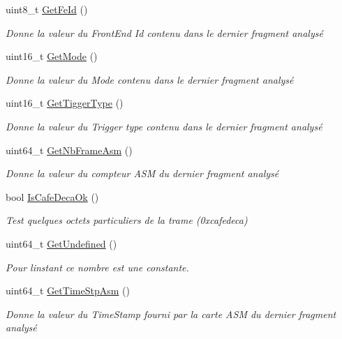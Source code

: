 \begin{DoxyCompactItemize}
uint8\+\_\+t \hyperlink{class_decode_frame_a27a2218fdc331c7c4afb1b57c103edac}{Get\+Fe\+Id} ()
\begin{DoxyCompactList}\small\item\em Donne la valeur du Front\+End Id contenu dans le dernier fragment analysé \end{DoxyCompactList}\item 
uint16\+\_\+t \hyperlink{class_decode_frame_a0bb520a314a74665a0092dbbf0f32310}{Get\+Mode} ()
\begin{DoxyCompactList}\small\item\em Donne la valeur du Mode contenu dans le dernier fragment analysé \end{DoxyCompactList}\item 
uint16\+\_\+t \hyperlink{class_decode_frame_a4bd099178e4f7a067dac451d2cb844b2}{Get\+Tigger\+Type} ()
\begin{DoxyCompactList}\small\item\em Donne la valeur du Trigger type contenu dans le dernier fragment analysé \end{DoxyCompactList}\item 
uint64\+\_\+t \hyperlink{class_decode_frame_affbc2d0f3774cb4fff34b42c446a5955}{Get\+Nb\+Frame\+Asm} ()
\begin{DoxyCompactList}\small\item\em Donne la valeur du compteur A\+SM du dernier fragment analysé \end{DoxyCompactList}\item 
bool \hyperlink{class_decode_frame_a6dfe57ddaf11b02fd88c2edcc98091f3}{Is\+Cafe\+Deca\+Ok} ()
\begin{DoxyCompactList}\small\item\em Test quelques octets particuliers de la trame (0xcafedeca) \end{DoxyCompactList}\item 
uint64\+\_\+t \hyperlink{class_decode_frame_a77f130ef36c084573decb71523cb74a1}{Get\+Undefined} ()
\begin{DoxyCompactList}\small\item\em Pour l\textquotesingle{}instant ce nombre est une constante. \end{DoxyCompactList}\item 
uint64\+\_\+t \hyperlink{class_decode_frame_a8ceda592a6bd4ed68faaeeda53b433a0}{Get\+Time\+Stp\+Asm} ()
\begin{DoxyCompactList}\small\item\em Donne la valeur du Time\+Stamp fourni par la carte A\+SM du dernier fragment analysé \end{DoxyCompactList}\item 

\end{DoxyCompactItemize}
